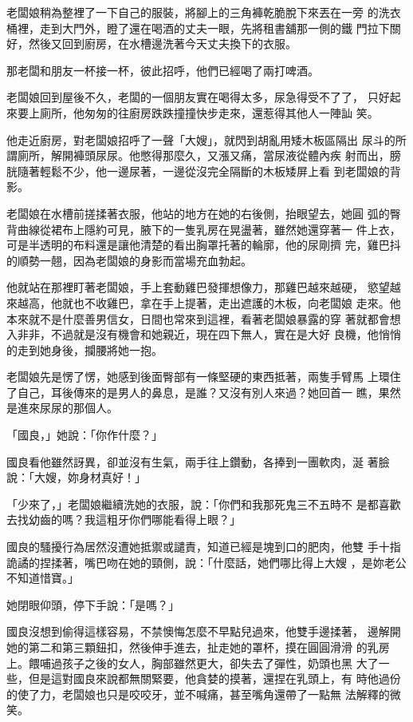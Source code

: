 老闆娘稍為整裡了一下自己的服裝，將腳上的三角褲乾脆脫下來丟在一旁
的洗衣桶裡，走到大門外，瞪了還在喝酒的丈夫一眼，先將租書舖那一側的鐵
門拉下關好，然後又回到廚房，在水槽邊洗著今天丈夫換下的衣服。

那老闆和朋友一杯接一杯，彼此招呼，他們已經喝了兩打啤酒。

老闆娘回到屋後不久，老闆的一個朋友實在喝得太多，尿急得受不了了，
只好起來要上廁所，他匆匆的往廚房跌跌撞撞快步走來，還惹得其他人一陣訕
笑。

他走近廚房，對老闆娘招呼了一聲「大嫂」，就閃到胡亂用矮木板區隔出
尿斗的所謂廁所，解開褲頭尿尿。他憋得那麼久，又漲又痛，當尿液從體內疾
射而出，膀胱隨著輕鬆不少，他一邊尿著，一邊從沒完全隔斷的木板矮屏上看
到老闆娘的背影。

老闆娘在水槽前搓揉著衣服，他站的地方在她的右後側，抬眼望去，她圓
弧的臀背曲線從裙布上隱約可見，腋下的一隻乳房在晃盪著，雖然她還穿著一
件上衣，可是半透明的布料還是讓他清楚的看出胸罩托著的輪廓，他的尿剛擠
完，雞巴抖的順勢一翹，因為老闆娘的身影而當場充血勃起。

他就站在那裡盯著老闆娘，手上套動雞巴發揮想像力，那雞巴越來越硬，
慾望越來越高，他就也不收雞巴，拿在手上提著，走出遮護的木板，向老闆娘
走來。他本來就不是什麼善男信女，日間也常來到這裡，看著老闆娘暴露的穿
著就都會想入非非，不過就是沒有機會和她親近，現在四下無人，實在是大好
良機，他悄悄的走到她身後，攔腰將她一抱。

老闆娘先是愣了愣，她感到後面臀部有一條堅硬的東西抵著，兩隻手臂馬
上環住了自己，耳後傳來的是男人的鼻息，是誰？又沒有別人來過？她回首一
瞧，果然是進來尿尿的那個人。

「國良，」她說：「你作什麼？」

國良看他雖然訝異，卻並沒有生氣，兩手往上鑽動，各捧到一團軟肉，涎
著臉說：「大嫂，妳身材真好！」

「少來了，」老闆娘繼續洗她的衣服，說：「你們和我那死鬼三不五時不
是都喜歡去找幼齒的嗎？我這粗牙你們哪能看得上眼？」

國良的騷擾行為居然沒遭她抵禦或譴責，知道已經是塊到口的肥肉，他雙
手十指詭譎的捏揉著，嘴巴吻在她的頸側，說：「什麼話，她們哪比得上大嫂
，是妳老公不知道惜寶。」

她閉眼仰頭，停下手說：「是嗎？」

國良沒想到偷得這樣容易，不禁懊悔怎麼不早點兒過來，他雙手邊揉著，
邊解開她的第二和第三顆鈕扣，然後伸手進去，扯走她的罩杯，摸在圓圓滑滑
的乳房上。餵哺過孩子之後的女人，胸部雖然更大，卻失去了彈性，奶頭也黑
大了一些，但是這對國良來說都無關緊要，他貪婪的摸著，還捏在乳頭上，有
時他過份的使了力，老闆娘也只是咬咬牙，並不喊痛，甚至嘴角還帶了一點無
法解釋的微笑。

